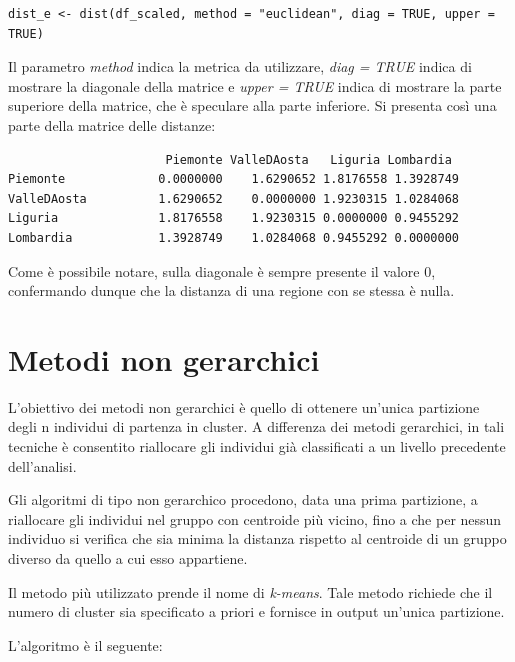 \vspace{5mm}
\begin{lstlisting}
dist_e <- dist(df_scaled, method = "euclidean", diag = TRUE, upper = TRUE)
\end{lstlisting}
\vspace{5mm}

Il parametro \textit{method} indica la metrica da utilizzare, \textit{diag = TRUE} indica di mostrare la diagonale della matrice e \textit{upper = TRUE} indica di mostrare la parte superiore della matrice, che è speculare alla parte inferiore. Si presenta così una parte della matrice delle distanze:

\vspace{5mm}
\begin{lstlisting}
                      Piemonte ValleDAosta   Liguria Lombardia
Piemonte             0.0000000    1.6290652 1.8176558 1.3928749
ValleDAosta          1.6290652    0.0000000 1.9230315 1.0284068
Liguria              1.8176558    1.9230315 0.0000000 0.9455292
Lombardia            1.3928749    1.0284068 0.9455292 0.0000000
\end{lstlisting}
\vspace{5mm}

Come è possibile notare, sulla diagonale è sempre presente il valore 0, confermando dunque che la distanza di una regione con se stessa è nulla.

\section{Metodi non gerarchici}\label{cap5.3}

L'obiettivo dei metodi non gerarchici è quello di ottenere un'unica partizione degli n individui di partenza in cluster. A differenza dei metodi gerarchici, in tali tecniche è consentito riallocare gli individui già classificati a un livello precedente dell'analisi. 

Gli algoritmi di tipo non gerarchico procedono, data una prima partizione, a riallocare gli individui nel gruppo con centroide più vicino, fino a che per nessun individuo si verifica che sia minima la distanza rispetto al centroide di un gruppo diverso da quello a cui esso appartiene.

Il metodo più utilizzato prende il nome di \textit{k-means}. Tale metodo richiede che il numero di cluster sia specificato a priori e fornisce in output un'unica partizione.

L'algoritmo è il seguente:

